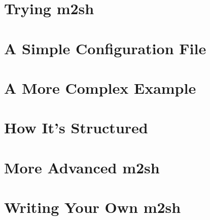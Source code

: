 \section{Trying m2sh}


\section{A Simple Configuration File}


\section{A More Complex Example}


\section{How It's Structured}


\section{More Advanced m2sh}



\section{Writing Your Own m2sh}


